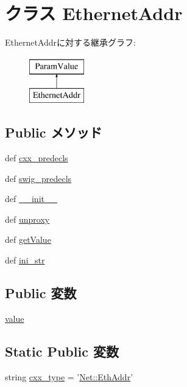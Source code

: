 \hypertarget{classm5_1_1params_1_1EthernetAddr}{
\section{クラス EthernetAddr}
\label{classm5_1_1params_1_1EthernetAddr}
}
EthernetAddrに対する継承グラフ:\begin{figure}[H]
\begin{center}
\leavevmode
\includegraphics[height=2cm]{classm5_1_1params_1_1EthernetAddr}
\end{center}
\end{figure}
\subsection*{Public メソッド}
\begin{DoxyCompactItemize}
\item 
def \hyperlink{classm5_1_1params_1_1EthernetAddr_a0b408a11a14bd1d770e28f71a6e14ab5}{cxx\_\-predecls}
\item 
def \hyperlink{classm5_1_1params_1_1EthernetAddr_ab3dbcf5716623eac67a8ccc074fa7e13}{swig\_\-predecls}
\item 
def \hyperlink{classm5_1_1params_1_1EthernetAddr_ac775ee34451fdfa742b318538164070e}{\_\-\_\-init\_\-\_\-}
\item 
def \hyperlink{classm5_1_1params_1_1EthernetAddr_a587cd3c1e899640dc09d63793aa8093b}{unproxy}
\item 
def \hyperlink{classm5_1_1params_1_1EthernetAddr_acc340fbd4335fa34f9d57fb454b28ed0}{getValue}
\item 
def \hyperlink{classm5_1_1params_1_1EthernetAddr_a33ebe6cd32bcbd15465fc28b9d94bf82}{ini\_\-str}
\end{DoxyCompactItemize}
\subsection*{Public 変数}
\begin{DoxyCompactItemize}
\item 
\hyperlink{classm5_1_1params_1_1EthernetAddr_afcc7a4b78ecd8fa7e713f8cfa0f51017}{value}
\end{DoxyCompactItemize}
\subsection*{Static Public 変数}
\begin{DoxyCompactItemize}
\item 
string \hyperlink{classm5_1_1params_1_1EthernetAddr_a2f1553ebb79374a68b36fdd6d8d82fc3}{cxx\_\-type} = '\hyperlink{structNet_1_1EthAddr}{Net::EthAddr}'
\end{DoxyCompactItemize}


